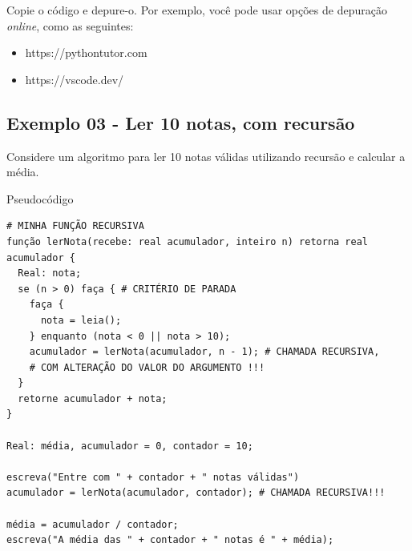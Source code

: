 \documentclass[12pt,a4paper]{article}
\providecommand{\tightlist}{%
      \setlength{\itemsep}{0pt}\setlength{\parskip}{0pt}}
\begin{document}
    Copie o código e depure-o. Por exemplo, você pode usar opções de
depuração \emph{online}, como as seguintes:

\begin{itemize}
\tightlist
\item
  https://pythontutor.com
\item
  https://vscode.dev/
\end{itemize}

    \hypertarget{exemplo-03---ler-10-notas-com-recursuxe3o}{%
\subsection{Exemplo 03 - Ler 10 notas, com
recursão}\label{exemplo-03---ler-10-notas-com-recursuxe3o}}

Considere um algoritmo para ler 10 notas válidas utilizando recursão e
calcular a média.

    Pseudocódigo

\begin{verbatim}
# MINHA FUNÇÃO RECURSIVA
função lerNota(recebe: real acumulador, inteiro n) retorna real acumulador {
  Real: nota;
  se (n > 0) faça { # CRITÉRIO DE PARADA
    faça {
      nota = leia();
    } enquanto (nota < 0 || nota > 10);
    acumulador = lerNota(acumulador, n - 1); # CHAMADA RECURSIVA,
    # COM ALTERAÇÃO DO VALOR DO ARGUMENTO !!!
  }
  retorne acumulador + nota;
}

Real: média, acumulador = 0, contador = 10;

escreva("Entre com " + contador + " notas válidas")
acumulador = lerNota(acumulador, contador); # CHAMADA RECURSIVA!!!

média = acumulador / contador;
escreva("A média das " + contador + " notas é " + média);
\end{verbatim}
\end{document}
